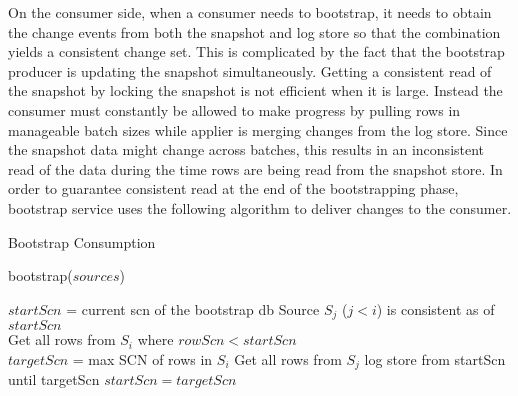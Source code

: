 On the consumer side, when a consumer needs to bootstrap, it needs to obtain the change events from both the snapshot and log store so that the combination yields a consistent change set. This is complicated by the fact that the bootstrap producer is updating the snapshot simultaneously. Getting a consistent read of the snapshot by locking the snapshot is not efficient when it is large. Instead the consumer must constantly be allowed to make progress by pulling rows in manageable batch sizes while applier is merging changes from the log store. Since the snapshot data might change across batches, this results in an inconsistent read of the data during the time rows are being read from the snapshot store.  In order to guarantee consistent read at the end of the bootstrapping phase,  bootstrap service uses the following algorithm to deliver changes to the consumer.

\begin{algorithm}
\label{alg:bootstrap}
\caption{Bootstrap Consumption}{bootstrap}{($sources$)} 
\begin{algorithmic}
\STATE $startScn$ = current scn of the bootstrap db
\REQUIRE Source $S_{j}$ ($j < i$) is consistent as of $startScn$ \\
\STATE Get all rows from $S_{i}$ where $rowScn < startScn$ \\
\STATE $targetScn$ = max SCN of rows in $S_{i}$
\STATE Get all rows from $S_{j}$ log store from startScn until targetScn
\ENDFOR
\STATE $startScn = targetScn$
\ENDFOR
\end{algorithmic}
\end{algorithm}

